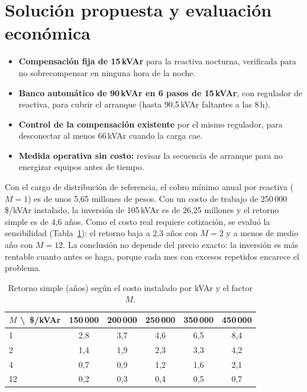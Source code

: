 \documentclass[11pt,a4paper]{article}
\begin{document}
\section{Solución propuesta y evaluación económica}
\begin{itemize}
\item \textbf{Compensación fija de 15\,kVAr} para la reactiva nocturna, verificada para no sobrecompensar en ninguna hora de la noche.
\item \textbf{Banco automático de 90\,kVAr en 6 pasos de 15\,kVAr}, con regulador de reactiva, para cubrir el arranque (hasta 90,5\,kVAr faltantes a las 8\,h).
\item \textbf{Control de la compensación existente} por el mismo regulador, para desconectar al menos 66\,kVAr cuando la carga cae.
\item \textbf{Medida operativa sin costo:} revisar la secuencia de arranque para no energizar equipos antes de tiempo.
\end{itemize}
Con el cargo de distribución de referencia, el cobro mínimo anual por reactiva ($M=1$) es de unos 5,65 millones de pesos. Con un costo de trabajo de 250\,000\,\$/kVAr instalado, la inversión de 105\,kVAr es de 26,25 millones y el retorno simple es de 4,6 años. Como el costo real requiere cotización, se evaluó la sensibilidad (Tabla~\ref{tab:sens}): el retorno baja a 2,3 años con $M=2$ y a menos de medio año con $M=12$. La conclusión no depende del precio exacto: la inversión es más rentable cuanto antes se haga, porque cada mes con excesos repetidos encarece el problema.

\begin{table}[htbp]\centering\small
\caption{Retorno simple (años) según el costo instalado por kVAr y el factor $M$.}\label{tab:sens}
\begin{tabular}{@{}lccccc@{}}\toprule
$M$ \textbackslash\ \$/kVAr & 150\,000 & 200\,000 & 250\,000 & 350\,000 & 450\,000 \\\midrule
1 & 2,8 & 3,7 & 4,6 & 6,5 & 8,4 \\
2 & 1,4 & 1,9 & 2,3 & 3,3 & 4,2 \\
4 & 0,7 & 0,9 & 1,2 & 1,6 & 2,1 \\
12 & 0,2 & 0,3 & 0,4 & 0,5 & 0,7 \\\bottomrule
\end{tabular}
\end{table}
\end{document}
